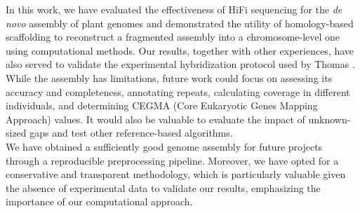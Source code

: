 
In this work, we have evaluated the effectiveness of \ac{HiFi} sequencing for the \textit{de novo} assembly of plant genomes and demonstrated the utility of homology-based scaffolding to reconstruct a fragmented assembly into a chromosome-level one using computational methods. Our results, together with other experiences, have also served to validate the experimental hybridization protocol used by Thomas \etal. \cite{bataillonGenotypePhenotypeGenetic2022}\\

While the assembly has limitations, future work could focus on assessing its accuracy and completeness, annotating repeats, calculating coverage in different individuals, and determining CEGMA (Core Eukaryotic Genes Mapping Approach) values. It would also be valuable to evaluate the impact of unknown-sized gaps and test other reference-based algorithms. \\

We have obtained a sufficiently good genome assembly for future projects through a reproducible preprocessing pipeline. Moreover, we have opted for a conservative and transparent methodology, which is particularly valuable given the absence of experimental data to validate our results, emphasizing the importance of our computational approach.\\